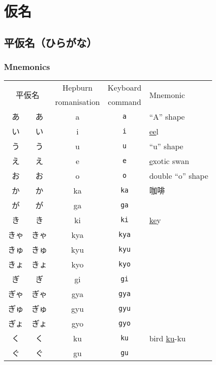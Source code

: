 \documentclass[../nihongo-gakushuu-kyouzai.tex]{subfiles}
\begin{document}
\section{仮名}
\subsection{平仮名（ひらがな）}
\subsubsection{Mnemonics}

\begin{longtable}[c]{@{}ccccl@{}}
    \toprule
    \multicolumn{2}{c}{\multirow{2}{*}{平仮名}} & Hepburn & Keyboard & \multirow{2}{*}{Mnemonic} \\
    \multicolumn{2}{c}{} & romanisation & command & \\* \midrule
    あ & {\sffamily あ} & a & \texttt{a} & ``A'' shape \\
    い & {\sffamily い} & i & \texttt{i} & \ul{ee}l \\
    う & {\sffamily う} & u & \texttt{u} & ``u'' shape \\
    え & {\sffamily え} & e & \texttt{e} & \ul{e}xotic swan \\
    お & {\sffamily お} & o & \texttt{o} & double ``o'' shape \\
    か & {\sffamily か} & ka & \texttt{ka} & 咖啡 \\
    が & {\sffamily が} & ga & \texttt{ga} &  \\
    き & {\sffamily き} & ki & \texttt{ki} & \ul{ke}y \\
    きゃ & {\sffamily きゃ} & kya & \texttt{kya} &  \\
    きゅ & {\sffamily きゅ} & kyu & \texttt{kyu} &  \\
    きょ & {\sffamily きょ} & kyo & \texttt{kyo} &  \\
    ぎ & {\sffamily ぎ} & gi & \texttt{gi} &  \\
    ぎゃ & {\sffamily ぎゃ} & gya & \texttt{gya} &  \\
    ぎゅ & {\sffamily ぎゅ} & gyu & \texttt{gyu} &  \\
    ぎょ & {\sffamily ぎょ} & gyo & \texttt{gyo} &  \\
    く & {\sffamily く} & ku & \texttt{ku} & bird \ul{ku}-ku \\
    ぐ & {\sffamily ぐ} & gu & \texttt{gu} &  \\

\end{longtable}
\end{document}
